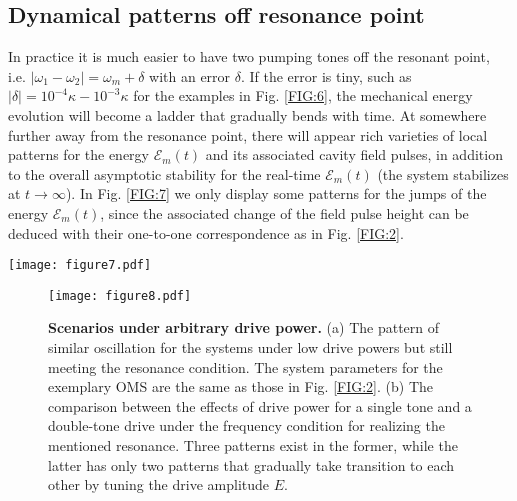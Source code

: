 \documentclass[a4paper,fleqn]{cas-dc}
\begin{document}
\subsection{Dynamical patterns off resonance point}
In practice it is much easier to have two pumping tones off the resonant point, i.e. $|\omega_1-\omega_2|=\omega_m+\delta$ with an error $\delta$. If the error is tiny, such as $|\delta|=10^{-4}\kappa- 10^{-3}\kappa$ for the examples in Fig. \ref{FIG:6}, the mechanical energy evolution will become a 
ladder that gradually bends with time. At somewhere further away from the resonance point, there will appear rich varieties of local patterns for the energy $\mathcal{E}_m(t)$ and its associated cavity field pulses, in addition to the overall asymptotic stability for the real-time $\mathcal{E}_m(t)$ (the system stabilizes at $t\rightarrow\infty$). In Fig. \ref{FIG:7} we only display some patterns for the jumps of the energy $\mathcal{E}_m(t)$, since the associated change of the field pulse height can be deduced with their one-to-one correspondence as in Fig. \ref{FIG:2}. 

\begin{figure*}
	\centering
		\texttt{[image: figure7.pdf]}
	\caption{{\bf Periodic mechanical energy patterns off the resonance point,} The stabilized period is determined by the ratio $\omega_m/|\delta|$. The evolution in (d) with an irrational ratio $\omega_m/\delta$ first undergoes an aperiodic stage before its stabilization to a periodic pattern. The setup in these processes has the same parameters as those in Fig. \ref{FIG:2} and $E/\kappa=2\times 10^5$. }
	\label{FIG:7}
\end{figure*}

\begin{figure}
	\centering
		\texttt{[image: figure8.pdf]}
	\caption{{\bf Scenarios under arbitrary drive power.} (a) The pattern of similar oscillation for the systems under low drive powers but still meeting the resonance condition. The system parameters for the exemplary OMS are the same as those in Fig. \ref{FIG:2}. (b) The comparison between the effects of drive power for a single tone and a double-tone drive under the frequency condition for realizing the mentioned resonance. Three patterns exist in the former, while the latter has only two patterns that gradually take transition to each other by tuning the drive amplitude $E$.  }
	\label{FIG:8}
 \vspace{-0.3cm}
\end{figure}
\end{document}
